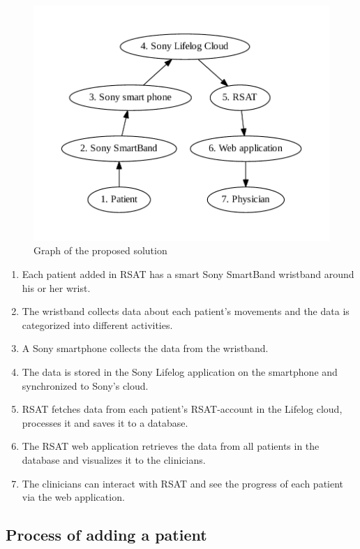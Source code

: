 \documentclass{cslthse-msc}
\begin{document}
\begin{figure}[!hbt]
\centering
\includegraphics[scale=0.8]{proposed.pdf} 
\caption{Graph of the proposed solution}\label{fig:pro}
\end{figure}


\begin{enumerate}
    \item Each patient added in RSAT has a smart Sony SmartBand wristband around his or her wrist.
    \item The wristband collects data about each patient's movements and the data is categorized into different activities.
    \item A Sony smartphone collects the data from the wristband. 
    \item The data is stored in the Sony Lifelog application on the smartphone and synchronized to Sony's cloud.
    \item RSAT fetches data from each patient's RSAT-account in the Lifelog cloud, processes it and saves it to a database.
\item The RSAT web application retrieves the data from all patients in the database and visualizes it to the clinicians.
\item The clinicians can interact with RSAT and see the progress of each patient via the web application. 
\end{enumerate}

\subsection{Process of adding a patient}
\end{document}
